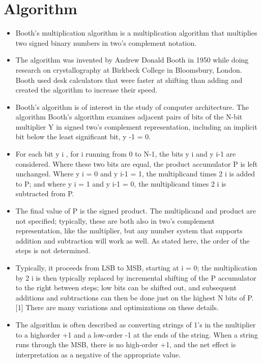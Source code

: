 \documentclass[10pt,a4paper]{article}
\begin{document}
	
\section{Algorithm}
	\begin{itemize}
		\item 	Booth's multiplication algorithm is a multiplication algorithm that multiplies two signed  binary numbers in two's complement notation.  
		\item 	The algorithm was invented by Andrew Donald Booth in 1950 while doing research on crystallography at Birkbeck College in Bloomsbury, London. Booth used desk calculators that were faster at shifting than adding and created the algorithm to increase 
		their speed.  
		\item 	Booth's algorithm is of interest in the study of computer architecture. The algorithm Booth's algorithm examines adjacent pairs of bits of the N-bit multiplier Y in signed two's complement representation, including an implicit bit below the least significant bit, 
		y -1 = 0.  
		\item 	For each bit y i , for i running from 0 to N-1, the bits y i and y i-1 are considered. Where these two bits are equal, the product accumulator P is left unchanged. Where y i = 0 and y i-1 = 1, the multiplicand times 2 i is added to P; and where y i = 1 and y i-1 = 0, the 
		multiplicand times 2 i is subtracted from P.  
		\item 	The final value of P is the signed product. The multiplicand and product are not specified; typically, these are both also in two's complement representation, like the multiplier, but any number system that supports addition and subtraction will work as 
		well. As stated here, the order of the steps is not determined.  
		\item 	Typically, it proceeds from LSB to MSB, starting at i = 0; the multiplication by 2 i is then typically replaced by incremental shifting of the P accumulator to the right between steps; low bits can be shifted out, and subsequent additions and subtractions can then be done just on the highest N bits of P.[1] There are many variations and optimizations on 
		these details.  
		\item 	The algorithm is often described as converting strings of 1's in the multiplier to a highorder +1 and a low-order -1 at the ends of the string. When a string runs through the MSB, there is no high-order +1, and the net effect is interpretation as a negative of the appropriate value.  
	\end{itemize}
	
\end{document}
